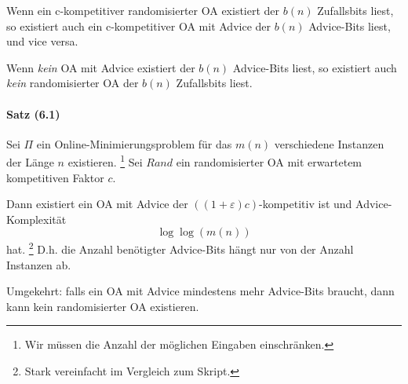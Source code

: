 Wenn ein c-kompetitiver randomisierter OA existiert der $b(n)$ Zufallsbits liest,
so existiert auch ein c-kompetitiver OA mit Advice der $b(n)$ Advice-Bits liest, und vice versa.

Wenn \emph{kein} OA mit Advice existiert der $b(n)$ Advice-Bits liest,
so existiert auch \emph{kein} randomisierter OA der $b(n)$ Zufallsbits liest.

\paragraph{Satz (6.1)}
Sei $\Pi$ ein Online-Minimierungsproblem für das $m(n)$ verschiedene Instanzen der Länge $n$ existieren.
\footnote{Wir müssen die Anzahl der möglichen Eingaben einschränken.}
Sei $Rand$ ein randomisierter OA mit erwartetem kompetitiven Faktor $c$.

Dann existiert ein OA mit Advice der $((1 + \varepsilon) c)$-kompetitiv ist und Advice-Komplexität
$$\log \log (m(n))$$
hat. \footnote{Stark vereinfacht im Vergleich zum Skript.}
D.h. die Anzahl benötigter Advice-Bits hängt nur von der Anzahl Instanzen ab.

Umgekehrt: falls ein OA mit Advice mindestens mehr Advice-Bits braucht,
dann kann kein randomisierter OA existieren.
